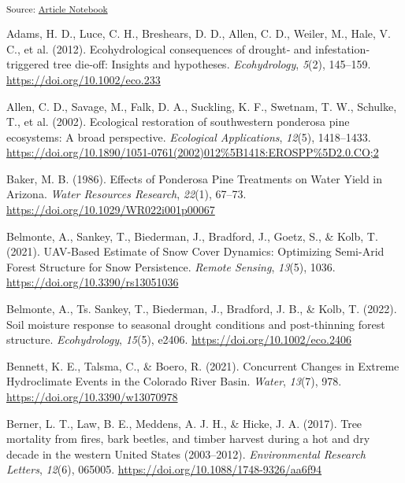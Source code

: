\documentclass[
]{agujournal2019}
\newlength{\cslhangindent}
\newenvironment{CSLReferences}[2] %
 {\begin{list}{}{%
  \setlength{\itemindent}{0pt}
  \setlength{\leftmargin}{0pt}
  \setlength{\parsep}{0pt}
  \ifodd #1
   \setlength{\leftmargin}{\cslhangindent}
   \setlength{\itemindent}{-1\cslhangindent}
  \fi
  \setlength{\itemsep}{#2\baselineskip}}}
 {\end{list}}
\begin{document}
\vspace{1em}

\textsubscript{Source:
\href{https://Ryan3Lima.github.io/ATUR-ForestThinning/index.ipynb.html}{Article
Notebook}}

\label{refs}
\begin{CSLReferences}{1}{0}
Adams, H. D., Luce, C. H., Breshears, D. D., Allen, C. D., Weiler, M.,
Hale, V. C., et al. (2012). Ecohydrological consequences of drought‐ and
infestation‐ triggered tree die‐off: Insights and hypotheses.
\emph{Ecohydrology}, \emph{5}(2), 145--159.
\url{https://doi.org/10.1002/eco.233}

Allen, C. D., Savage, M., Falk, D. A., Suckling, K. F., Swetnam, T. W.,
Schulke, T., et al. (2002). Ecological restoration of southwestern
ponderosa pine ecosystems: A broad perspective. \emph{Ecological
Applications}, \emph{12}(5), 1418--1433.
\url{https://doi.org/10.1890/1051-0761(2002)012\%5B1418:EROSPP\%5D2.0.CO;2}

Baker, M. B. (1986). Effects of {Ponderosa} {Pine} {Treatments} on
{Water} {Yield} in {Arizona}. \emph{Water Resources Research},
\emph{22}(1), 67--73. \url{https://doi.org/10.1029/WR022i001p00067}

Belmonte, A., Sankey, T., Biederman, J., Bradford, J., Goetz, S., \&
Kolb, T. (2021). {UAV}-{Based} {Estimate} of {Snow} {Cover} {Dynamics}:
{Optimizing} {Semi}-{Arid} {Forest} {Structure} for {Snow}
{Persistence}. \emph{Remote Sensing}, \emph{13}(5), 1036.
\url{https://doi.org/10.3390/rs13051036}

Belmonte, A., Ts. Sankey, T., Biederman, J., Bradford, J. B., \& Kolb,
T. (2022). Soil moisture response to seasonal drought conditions and
post‐thinning forest structure. \emph{Ecohydrology}, \emph{15}(5),
e2406. \url{https://doi.org/10.1002/eco.2406}

Bennett, K. E., Talsma, C., \& Boero, R. (2021). Concurrent {Changes} in
{Extreme} {Hydroclimate} {Events} in the {Colorado} {River} {Basin}.
\emph{Water}, \emph{13}(7), 978. \url{https://doi.org/10.3390/w13070978}

Berner, L. T., Law, B. E., Meddens, A. J. H., \& Hicke, J. A. (2017).
Tree mortality from fires, bark beetles, and timber harvest during a hot
and dry decade in the western {United} {States} (2003--2012).
\emph{Environmental Research Letters}, \emph{12}(6), 065005.
\url{https://doi.org/10.1088/1748-9326/aa6f94}


\end{CSLReferences}
\end{document}
